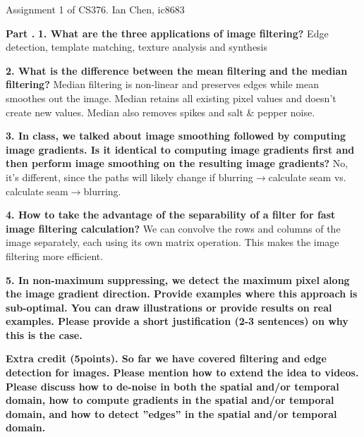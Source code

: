 \documentclass[11pt]{article}
\begin{document}
    Assignment 1 of CS376. Ian Chen, ic8683\newline
    
    \textbf{Part .}\newline
    \textbf{1. What are the three applications of image filtering?}
    Edge detection, template matching, texture analysis and synthesis

    \textbf{2. What is the difference between the mean filtering and the median filtering?}
    Median filtering is non-linear and preserves edges while mean smoothes out the image.
    Median retains all existing pixel values and doesn’t create new values. Median also removes spikes and salt & pepper noise.

    \textbf{3. In class, we talked about image smoothing followed by computing image gradients.
    Is it identical to computing image gradients first and then perform image smoothing on the resulting image gradients?}
    No, it’s different, since the paths will likely change if blurring$\rightarrow$calculate seam vs. calculate seam$\rightarrow$blurring.
    
    \textbf{4. How to take the advantage of the separability of a filter for fast image filtering calculation?}
    We can convolve the rows and columns of the image separately, each using its own matrix operation. This makes the image filtering more efficient.

    \textbf{5. In non-maximum suppressing, we detect the maximum pixel along the image gradient direction. Provide examples where this approach is sub-optimal.
    You can draw illustrations or provide results on real examples. Please provide a short justification (2-3 sentences) on why this is the case.}
    
    \textbf{Extra credit (5points). So far we have covered filtering and edge detection for images. Please mention how to extend the idea to videos.
    Please discuss how to de-noise in both the spatial and/or temporal domain, how to compute gradients in the spatial and/or temporal domain,
        and how to detect ”edges” in the spatial and/or temporal domain.}
\end{document}
